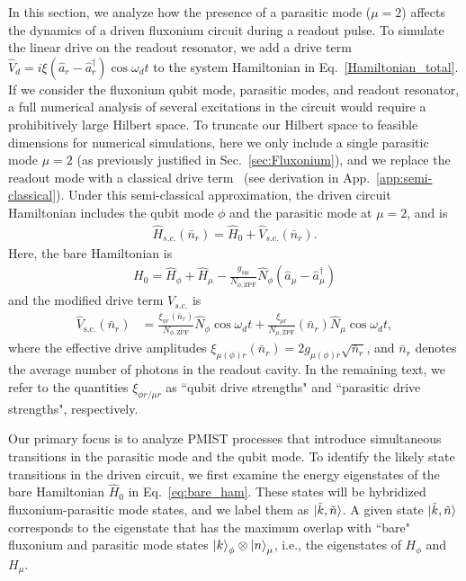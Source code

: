 \documentclass[%
reprint,
superscriptaddress,
 amsmath,amssymb,
 aps,
 prx,
longbibliography,
floatfix,
]{revtex4-2}
\begin{document}
In this section, we analyze how the presence of a parasitic mode ($\mu=2$) affects the dynamics of a driven fluxonium circuit during a readout pulse. To simulate the linear drive on the readout resonator, we add a drive term $\hat{V}_d=i\xi (\hat a_r-\hat a_r^\dagger)\cos{\omega_d t}$ to the system Hamiltonian in Eq.~\ref{Hamiltonian_total}. If we consider the fluxonium qubit mode, parasitic modes, and readout resonator, a full numerical analysis of several excitations in the circuit would require a prohibitively large Hilbert space. To truncate our Hilbert space to feasible dimensions for numerical simulations, here we only include a single parasitic mode $\mu=2$ (as previously justified in Sec.~\ref{sec:Fluxonium}), and we replace the readout mode with a classical drive term~\cite{cohen2023reminiscence,dumas2024unified,xiao2023diagrammatic} (see derivation in App.~\ref{app:semi-classical}). Under this semi-classical approximation, the driven circuit Hamiltonian includes the qubit mode $\phi$ and the parasitic mode at $\mu=2$, and is
\begin{align}
  \hat H_{s.c.}(\bar n_r)=\hat H_0+\hat V_{s.c.}(\bar n_r).  \label{eq:drive_Ham}
\end{align}
Here, the bare Hamiltonian is
\begin{align}
H_0=\hat H_\phi+\hat H_{\mu}-\frac{g_{\phi\mu}}{N_{\phi,\mathrm{ZPF}}} \hat N_\phi (\hat a_{\mu}-\hat a_{\mu}^\dagger) \label{eq:bare_ham} 
\end{align}
and the modified drive term $V_{s.c.}$ is
\begin{align}
    \hat V_\textrm{s.c.}(\bar n_r)&=\frac{\xi_{\phi r}(\bar n_r)}{N_{\phi,\mathrm{ZPF}}} \hat N_\phi\cos{\omega_d t}+\frac{\xi_{\mu r}}{N_{\mu, \mathrm{ZPF}}}(\bar n_r) \hat N_\mu\cos{\omega_d t}\label{eq:drive},
\end{align}
where the effective drive amplitudes $\xi_{\mu(\phi) r}(\bar n_r)=2g_{\mu(\phi) r}\sqrt{\bar n_r}$, and $\bar n_r$ denotes the average number of photons in the readout cavity. In the remaining text, we refer to the quantities $\xi_{\phi r/\mu r}$ as  ``qubit drive strengths" and ``parasitic drive strengths", respectively. 

Our primary focus is to analyze PMIST processes that introduce simultaneous transitions in the parasitic mode and the qubit mode. To identify the likely state transitions in the driven circuit, we first examine the energy eigenstates of the bare Hamiltonian $\hat{H}_0$ in Eq.~\ref{eq:bare_ham}. These states will be hybridized fluxonium-parasitic mode states, and we label them as $\ket{\tilde{k}, \tilde{n}}$.  A given state $\ket{\tilde{k}, \tilde{n}}$ corresponds to the eigenstate that has the maximum overlap with ``bare" fluxonium and parasitic mode states $\ket{k}_\phi\otimes\ket{n}_\mu$, i.e., the eigenstates of $H_{\phi}$ and $H_{\mu}$.
\end{document}
